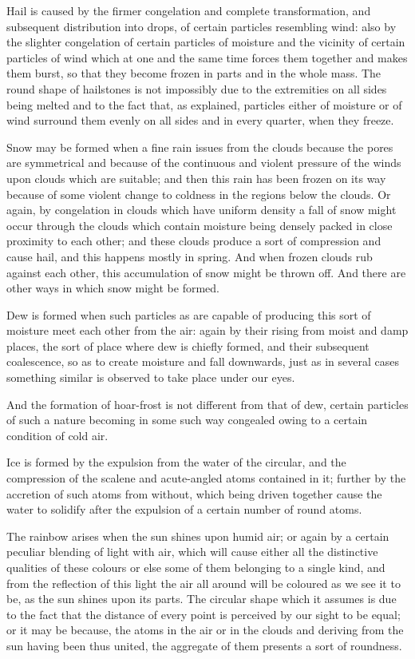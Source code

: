 \documentclass{stex}
\begin{document}
Hail is caused by the firmer congelation and complete transformation, and subsequent distribution into drops, of certain particles resembling wind: also by the slighter congelation of certain particles of moisture and the vicinity of certain particles of wind which at one and the same time forces them together and makes them burst, so that they become frozen in parts and in the whole mass.
The round shape of hailstones is not impossibly due to the extremities on all sides being melted and to the fact that, as explained, particles either of moisture or of wind surround them evenly on all sides and in every quarter, when they freeze.

Snow may be formed when a fine rain issues from the clouds because the pores are symmetrical and because of the continuous and violent pressure of the winds upon clouds which are suitable; and then this rain has been frozen on its way because of some violent change to coldness in the regions below the clouds.
Or again, by congelation in clouds which have uniform density a fall of snow might occur through the clouds which contain moisture being densely packed in close proximity to each other; and these clouds produce a sort of compression and cause hail, and this happens mostly in spring.
And when frozen clouds rub against each other, this accumulation of snow might be thrown off.
And there are other ways in which snow might be formed.

Dew is formed when such particles as are capable of producing this sort of moisture meet each other from the air: again by their rising from moist and damp places, the sort of place where dew is chiefly formed, and their subsequent coalescence, so as to create moisture and fall downwards, just as in several cases something similar is observed to take place under our eyes.

And the formation of hoar-frost is not different from that of dew, certain particles of such a nature becoming in some such way congealed owing to a certain condition of cold air.

Ice is formed by the expulsion from the water of the circular, and the compression of the scalene and acute-angled atoms contained in it; further by the accretion of such atoms from without, which being driven together cause the water to solidify after the expulsion of a certain number of round atoms.

The rainbow arises when the sun shines upon humid air; or again by a certain peculiar blending of light with air, which will cause either all the distinctive qualities of these colours or else some of them belonging to a single kind, and from the reflection of this light the air all around will be coloured as we see it to be, as the sun shines upon its parts.
The circular shape which it assumes is due to the fact that the distance of every point is perceived by our sight to be equal; or it may be because, the atoms in the air or in the clouds and deriving from the sun having been thus united, the aggregate of them presents a sort of roundness.
\end{document}
